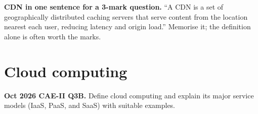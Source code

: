 \documentclass[11pt,a4paper]{article}
\begin{document}
\begin{rememberbox}
\textbf{CDN in one sentence for a 3-mark question.} ``A CDN is a set of geographically distributed caching servers that serve content from the location nearest each user, reducing latency and origin load.'' Memorise it; the definition alone is often worth the marks.
\end{rememberbox}

\section{Cloud computing}

\begin{pyqbox}
\textbf{Oct 2026 CAE-II Q3B.} Define cloud computing and explain its major service models (IaaS, PaaS, and SaaS) with suitable examples.
\end{pyqbox}
\end{document}
